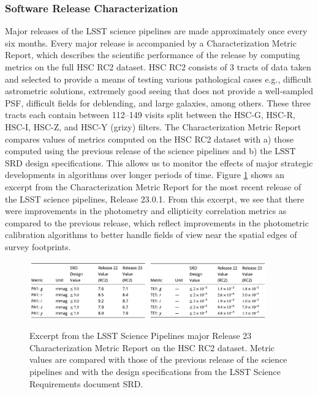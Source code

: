 \subsubsection{Software Release Characterization } \label{sssec:characterization}

Major releases of the LSST science pipelines are made approximately once every six months. 
Every major release is accompanied by a Characterization Metric Report, which describes the scientific performance of the release by computing \faro metrics on the full HSC RC2 dataset. 
HSC RC2 consists of 3 tracts of data taken and selected to provide a means of testing various pathological cases e.g., difficult astrometric solutions, extremely good seeing that does not provide a well-sampled PSF, difficult fields for deblending, and large galaxies, among others. 
These three tracts each contain between 112--149 visits split between the HSC-G, HSC-R, HSC-I, HSC-Z, and HSC-Y (grizy) filters.
The Characterization Metric Report compares values of metrics computed on the HSC RC2 dataset with a) those computed using the previous release of the science pipelines and b) the LSST SRD design specifications. 
This allows us to monitor the effects of major strategic developments in algorithms over longer periods of time. 
Figure \ref{fig:cmr_r23} shows an excerpt from the Characterization Metric Report \cite{dmtr-351} for the most recent release of the LSST science pipelines, Release 23.0.1.
From this excerpt, we see that there were improvements in the photometry and ellipticity correlation metrics as compared to the previous release, which reflect improvements in the photometric calibration algorithms to better handle fields of view near the spatial edges of survey footprints. 
\begin{figure}[!ht]
  \centering
  \includegraphics[width=0.45\textwidth]{figures/cmr_r23_photometric_metrics} 
  \hspace{0.5cm}
  \includegraphics[width=0.45\textwidth]{figures/cmr_r23_ellipticity_metrics}
  \par\medskip %
  \caption{Excerpt from the  LSST Science Pipelines major Release 23 Characterization Metric Report on the HSC RC2 dataset. Metric values are compared with those of the previous release of the science pipelines and with the design specifications from the LSST Science Requirements document SRD.}
  \label{fig:cmr_r23}
\end{figure}

